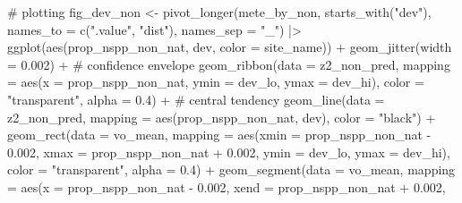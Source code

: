\documentclass[
  letterpaper,
  DIV=11,
  numbers=noendperiod]{scrartcl}
\newenvironment{Shaded}{\begin{snugshade}}{\end{snugshade}}
\newcommand{\AttributeTok}[1]{\textcolor[rgb]{0.40,0.45,0.13}{#1}}
\newcommand{\CommentTok}[1]{\textcolor[rgb]{0.37,0.37,0.37}{#1}}
\newcommand{\FloatTok}[1]{\textcolor[rgb]{0.68,0.00,0.00}{#1}}
\newcommand{\FunctionTok}[1]{\textcolor[rgb]{0.28,0.35,0.67}{#1}}
\newcommand{\NormalTok}[1]{\textcolor[rgb]{0.00,0.23,0.31}{#1}}
\newcommand{\OtherTok}[1]{\textcolor[rgb]{0.00,0.23,0.31}{#1}}
\newcommand{\SpecialCharTok}[1]{\textcolor[rgb]{0.37,0.37,0.37}{#1}}
\newcommand{\StringTok}[1]{\textcolor[rgb]{0.13,0.47,0.30}{#1}}
\begin{document}
\begin{Shaded}
\begin{Highlighting}[]
\CommentTok{\# plotting}
\NormalTok{fig\_dev\_non }\OtherTok{\textless{}{-}} \FunctionTok{pivot\_longer}\NormalTok{(mete\_by\_non, }\FunctionTok{starts\_with}\NormalTok{(}\StringTok{"dev"}\NormalTok{), }
                            \AttributeTok{names\_to =} \FunctionTok{c}\NormalTok{(}\StringTok{".value"}\NormalTok{, }\StringTok{"dist"}\NormalTok{), }
                            \AttributeTok{names\_sep =} \StringTok{"\_"}\NormalTok{) }\SpecialCharTok{|\textgreater{}} 
    \FunctionTok{ggplot}\NormalTok{(}\FunctionTok{aes}\NormalTok{(prop\_nspp\_non\_nat, dev, }\AttributeTok{color =}\NormalTok{ site\_name)) }\SpecialCharTok{+}
    \FunctionTok{geom\_jitter}\NormalTok{(}\AttributeTok{width =} \FloatTok{0.002}\NormalTok{) }\SpecialCharTok{+}
    \CommentTok{\# confidence envelope}
    \FunctionTok{geom\_ribbon}\NormalTok{(}\AttributeTok{data =}\NormalTok{ z2\_non\_pred, }
                \AttributeTok{mapping =} \FunctionTok{aes}\NormalTok{(}\AttributeTok{x =}\NormalTok{ prop\_nspp\_non\_nat, }
                              \AttributeTok{ymin =}\NormalTok{ dev\_lo, }
                              \AttributeTok{ymax =}\NormalTok{ dev\_hi), }
                \AttributeTok{color =} \StringTok{"transparent"}\NormalTok{, }\AttributeTok{alpha =} \FloatTok{0.4}\NormalTok{) }\SpecialCharTok{+}
    \CommentTok{\# central tendency }
    \FunctionTok{geom\_line}\NormalTok{(}\AttributeTok{data =}\NormalTok{ z2\_non\_pred, }
              \AttributeTok{mapping =} \FunctionTok{aes}\NormalTok{(prop\_nspp\_non\_nat, dev), }
              \AttributeTok{color =} \StringTok{"black"}\NormalTok{) }\SpecialCharTok{+}
    \FunctionTok{geom\_rect}\NormalTok{(}\AttributeTok{data =}\NormalTok{ vo\_mean, }
              \AttributeTok{mapping =} \FunctionTok{aes}\NormalTok{(}\AttributeTok{xmin =}\NormalTok{ prop\_nspp\_non\_nat }\SpecialCharTok{{-}} \FloatTok{0.002}\NormalTok{, }
                            \AttributeTok{xmax =}\NormalTok{ prop\_nspp\_non\_nat }\SpecialCharTok{+} \FloatTok{0.002}\NormalTok{, }
                            \AttributeTok{ymin =}\NormalTok{ dev\_lo, }
                            \AttributeTok{ymax =}\NormalTok{ dev\_hi), }
              \AttributeTok{color =} \StringTok{"transparent"}\NormalTok{, }\AttributeTok{alpha =} \FloatTok{0.4}\NormalTok{) }\SpecialCharTok{+}
    \FunctionTok{geom\_segment}\NormalTok{(}\AttributeTok{data =}\NormalTok{ vo\_mean, }
              \AttributeTok{mapping =} \FunctionTok{aes}\NormalTok{(}\AttributeTok{x =}\NormalTok{ prop\_nspp\_non\_nat }\SpecialCharTok{{-}} \FloatTok{0.002}\NormalTok{, }
                            \AttributeTok{xend =}\NormalTok{ prop\_nspp\_non\_nat }\SpecialCharTok{+} \FloatTok{0.002}\NormalTok{, }

\end{Highlighting}
\end{Shaded}
\end{document}
